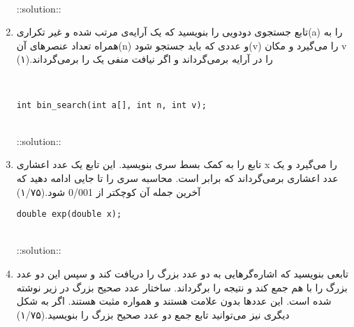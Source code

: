 \documentclass[12pt, a4paper]{article}
\begin{document}
\begin{enumerate}
\begin{latin}
\\
::solution:: \\

\end{latin}

\item
تابع جستجوی دودویی را بنویسید که یک آرایه‌ی مرتب شده و غیر تکراری(a) را به همراه تعداد عنصرهای آن(n) و عددی که باید
 جستجو شود(v) را می‌گیرد و مکان v را در آرایه برمی‌گرداند و اگر نیافت منفی یک را برمی‌گرداند.(۱)


\begin{latin}
\\
\begin{lstlisting}[numbers=none] 
int bin_search(int a[], int n, int v);
\end{lstlisting}
\end{latin}

\begin{latin}
\\
::solution:: \\

\end{latin}


\item
تابع
را به کمک بسط سری 
بنویسید. این تابع یک عدد اعشاری x را می‌گیرد و یک عدد اعشاری برمی‌گرداند که برابر
است.
 محاسبه سری را تا جایی ادامه دهید که آخرین جمله آن
کوچکتر از 0/001 شود.(۱/۷۵)
\begin{latin}
\begin{lstlisting}[numbers=none] 
double exp(double x);
\end{lstlisting}
\end{latin}


\begin{latin}
\\
::solution:: \\

\end{latin}


\item
تابعی بنویسید که اشاره‌گرهایی به دو عدد بزرگ را دریافت کند و سپس این دو عدد بزرگ را با هم جمع کند و نتیجه را برگرداند. ساختار عدد صحیح بزرگ در زیر نوشته شده است.
این عددها بدون علامت هستند و همواره مثبت هستند. اگر به شکل دیگری نیز می‌توانید  تابع جمع دو عدد صحیح بزرگ را بنویسید.(۱/۷۵)


\end{enumerate}
\end{document}

